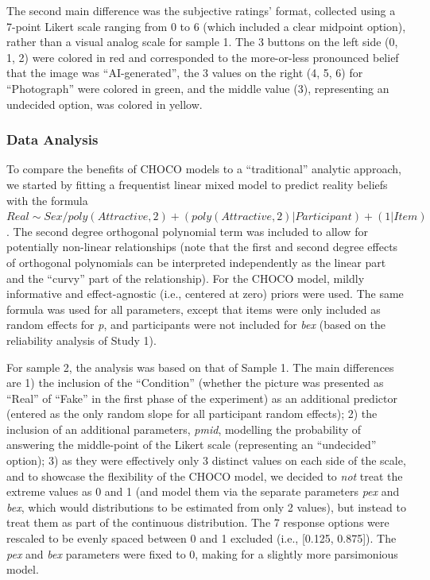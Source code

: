 \documentclass[
  jou,
  floatsintext,
  longtable,
  nolmodern,
  notxfonts,
  notimes,
  colorlinks=true,linkcolor=blue,citecolor=blue,urlcolor=blue]{apa7}
\begin{document}
The second main difference was the subjective ratings' format, collected
using a 7-point Likert scale ranging from 0 to 6 (which included a clear
midpoint option), rather than a visual analog scale for sample 1. The 3
buttons on the left side (0, 1, 2) were colored in red and corresponded
to the more-or-less pronounced belief that the image was
``AI-generated'', the 3 values on the right (4, 5, 6) for ``Photograph''
were colored in green, and the middle value (3), representing an
undecided option, was colored in yellow.

\subsubsection{Data Analysis}\label{data-analysis-1}

To compare the benefits of CHOCO models to a ``traditional'' analytic
approach, we started by fitting a frequentist linear mixed model to
predict reality beliefs with the formula
\(Real\sim Sex / poly(Attractive, 2) + (poly(Attractive, 2)|Participant) + (1|Item)\).
The second degree orthogonal polynomial term was included to allow for
potentially non-linear relationships (note that the first and second
degree effects of orthogonal polynomials can be interpreted
independently as the linear part and the ``curvy'' part of the
relationship). For the CHOCO model, mildly informative and
effect-agnostic (i.e., centered at zero) priors were used. The same
formula was used for all parameters, except that items were only
included as random effects for \emph{p}, and participants were not
included for \emph{bex} (based on the reliability analysis of Study 1).

For sample 2, the analysis was based on that of Sample 1. The main
differences are 1) the inclusion of the ``Condition'' (whether the
picture was presented as ``Real'' of ``Fake'' in the first phase of the
experiment) as an additional predictor (entered as the only random slope
for all participant random effects); 2) the inclusion of an additional
parameters, \emph{pmid}, modelling the probability of answering the
middle-point of the Likert scale (representing an ``undecided'' option);
3) as they were effectively only 3 distinct values on each side of the
scale, and to showcase the flexibility of the CHOCO model, we decided to
\emph{not} treat the extreme values as 0 and 1 (and model them via the
separate parameters \emph{pex} and \emph{bex}, which would distributions
to be estimated from only 2 values), but instead to treat them as part
of the continuous distribution. The 7 response options were rescaled to
be evenly spaced between 0 and 1 excluded (i.e., {[}0.125, 0.875{]}).
The \emph{pex} and \emph{bex} parameters were fixed to 0, making for a
slightly more parsimonious model.
\end{document}
